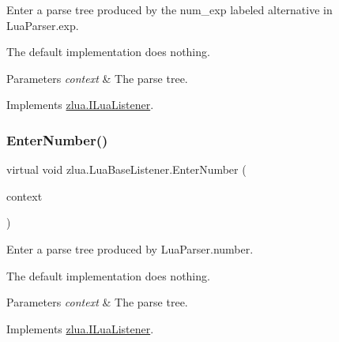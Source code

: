 Enter a parse tree produced by the {\ttfamily num\+\_\+exp} labeled alternative in Lua\+Parser.\+exp. 

The default implementation does nothing.


\begin{DoxyParams}{Parameters}
{\em context} & The parse tree.\\
\hline
\end{DoxyParams}


Implements \mbox{\hyperlink{interfacezlua_1_1_i_lua_listener_aaa1853b8a53c94c2e6a7ee14bc38a698}{zlua.\+I\+Lua\+Listener}}.

\mbox{\label{classzlua_1_1_lua_base_listener_a7a5db34cbf48dd81e72604d07e0e0038}} 
\subsubsection{\texorpdfstring{Enter\+Number()}{EnterNumber()}}
{\footnotesize\ttfamily virtual void zlua.\+Lua\+Base\+Listener.\+Enter\+Number (\begin{DoxyParamCaption}\item[{\mbox{[}\+Not\+Null\mbox{]} \mbox{\hyperlink{classzlua_1_1_lua_parser_1_1_number_context}{Lua\+Parser.\+Number\+Context}}}]{context }\end{DoxyParamCaption})\hspace{0.3cm}{\ttfamily [virtual]}}



Enter a parse tree produced by Lua\+Parser.\+number. 

The default implementation does nothing.


\begin{DoxyParams}{Parameters}
{\em context} & The parse tree.\\
\hline
\end{DoxyParams}


Implements \mbox{\hyperlink{interfacezlua_1_1_i_lua_listener_a2668a5683590d30b5a267950efa4e247}{zlua.\+I\+Lua\+Listener}}.

\mbox{\label{classzlua_1_1_lua_base_listener_a8c58530fc93d6206a2308109ae86410e}} 
